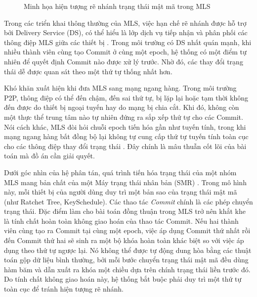 \documentclass[../DoAn.tex]{subfiles}
\begin{document}
\begin{figure}[htbp]
{
}
\caption{Minh họa hiện tượng rẽ nhánh trạng thái mật mã trong MLS}
\label{fig:cryptographic_state_fork}
\end{figure}

Trong các triển khai thông thường của MLS, việc hạn chế rẽ nhánh được hỗ trợ bởi Delivery Service (DS), có thể hiểu là lớp dịch vụ tiếp nhận và phân phối các thông điệp MLS giữa các thiết bị \cite{rfc9750}. Trong môi trường có DS nhất quán mạnh, khi nhiều thành viên cùng tạo Commit ở cùng một epoch, hệ thống có một điểm tự nhiên để quyết định Commit nào được xử lý trước. Nhờ đó, các thay đổi trạng thái dễ được quan sát theo một thứ tự thống nhất hơn.

Khó khăn xuất hiện khi đưa MLS sang mạng ngang hàng. Trong môi trường P2P, thông điệp có thể đến chậm, đến sai thứ tự, bị lặp lại hoặc tạm thời không đến được do thiết bị ngoại tuyến hay do mạng bị chia cắt. Khi đó, không còn một thực thể trung tâm nào tự nhiên đứng ra sắp xếp thứ tự cho các Commit. Nói cách khác, MLS đòi hỏi chuỗi epoch tiến hóa gần như tuyến tính, trong khi mạng ngang hàng bất đồng bộ lại không tự cung cấp thứ tự tuyến tính toàn cục cho các thông điệp thay đổi trạng thái \cite{rfc9750,gilbert2002brewers}. Đây chính là mâu thuẫn cốt lõi của bài toán mà đồ án cần giải quyết.

Dưới góc nhìn của hệ phân tán, quá trình tiến hóa trạng thái của một nhóm MLS mang bản chất của một Máy trạng thái nhân bản (SMR) \cite{schneider1990smr}. Trong mô hình này, mỗi thiết bị của người dùng duy trì một bản sao của trạng thái mật mã (như Ratchet Tree, KeySchedule). Các thao tác \textit{Commit} chính là các phép chuyển trạng thái. Đặc điểm làm cho bài toán đồng thuận trong MLS trở nên khắt khe là tính chất hoàn toàn không giao hoán của thao tác Commit. Nếu hai thành viên cùng tạo ra Commit tại cùng một epoch, việc áp dụng Commit thứ nhất rồi đến Commit thứ hai sẽ sinh ra một bộ khóa hoàn toàn khác biệt so với việc áp dụng theo thứ tự ngược lại. Nó không thể được tự động dung hòa bằng các thuật toán gộp dữ liệu bình thường, bởi mỗi bước chuyển trạng thái mật mã đều dùng hàm băm và dẫn xuất ra khóa một chiều dựa trên chính trạng thái liền trước đó. Do tính chất không giao hoán này, hệ thống bắt buộc phải duy trì một thứ tự toàn cục để tránh hiện tượng rẽ nhánh.
\end{document}
